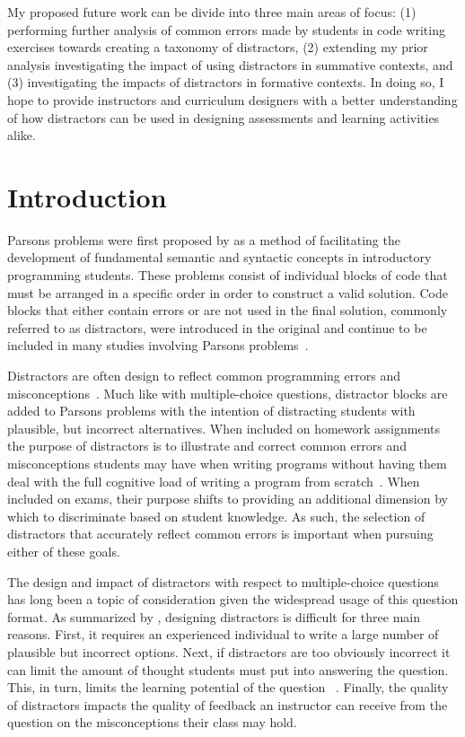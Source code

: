 \documentclass[authorversion,nonacm]{acmart}
\begin{document}
My proposed future work can be divide into three main areas of focus: (1)
performing further analysis of common errors made by students in code
writing exercises towards creating a taxonomy of distractors, (2) extending
my prior analysis investigating the impact of using distractors in summative
contexts, and (3) investigating the impacts of distractors in formative contexts.
In doing so, I hope to provide instructors and curriculum designers with a
better understanding of how distractors can be used in designing assessments and
learning activities alike.

\section{Introduction}

Parsons problems were first proposed by \citet{parsons2006parson} as a method
of facilitating the development of fundamental semantic and syntactic concepts
in introductory programming students. These problems consist of individual
blocks of code that must be arranged in a specific order in order to construct
a valid solution. Code blocks that either contain errors or are not used in the
final solution, commonly referred to as distractors, were introduced in the
original and continue to be included in many studies involving Parsons
problems~\cite{du2020review}.  

Distractors are often design to reflect common programming errors and
misconceptions~\cite{du2020review, parsons2006parson}.  Much like with
multiple-choice questions, distractor blocks are added to Parsons problems with
the intention of distracting students with plausible, but incorrect
alternatives.  When included on homework assignments the purpose of distractors
is to illustrate and correct common errors and misconceptions students may have
when writing programs without having them deal with the full cognitive load of
writing a program from scratch~\cite{ericson2017solving, haynes2021problem}.
When included on exams, their purpose shifts to providing an additional
dimension by which to discriminate based on student knowledge. As such, the
selection of distractors that accurately reflect common errors is important
when pursuing either of these goals. 

The design and impact of distractors with respect to multiple-choice questions
has long been a topic of consideration given the widespread usage of this
question format.  As summarized by \citet{gierl2017developing}, designing
distractors is difficult for three main reasons. First, it requires an
experienced individual to write a large number of plausible but incorrect
options.  Next, if distractors are too obviously incorrect it can limit the
amount of thought students must put into answering the question. This, in turn,
limits the learning potential of the question ~\cite{little2015optimizing}.
Finally, the quality of distractors impacts the quality of feedback an
instructor can receive from the question on the misconceptions their class may
hold.
\end{document}
